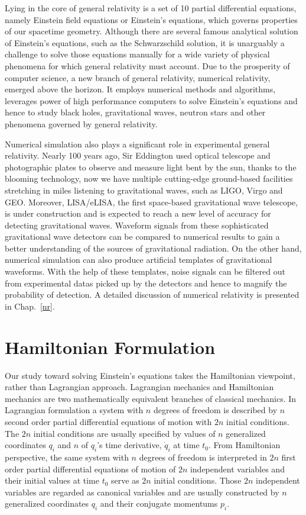 Lying in the core of general relativity is a set of 10 partial differential equations, namely Einstein field equations or Einstein's equations, which governs properties of our spacetime geometry. Although there are several famous analytical solution of Einstein's equations, such as the Schwarzschild solution, it is unarguably a challenge to solve those equations manually for a wide variety of physical phenomena for which general relativity must account. Due to the prosperity of computer science, a new branch of general relativity, numerical relativity, emerged above the horizon. It employs numerical methods and algorithms, leverages power of high performance computers to solve Einstein's equations and hence to study black holes, gravitational waves, neutron stars and other phenomena governed by general relativity.

Numerical simulation also plays a significant role in experimental general relativity. Nearly 100 years ago, Sir Eddington used optical telescope and photographic plates to observe and measure light bent by the sun, thanks to the blooming technology, now we have multiple cutting-edge ground-based facilities stretching in miles listening to gravitational waves, such as LIGO, Virgo and GEO. Moreover, LISA/eLISA, the first space-based gravitational wave telescope, is under construction and is expected to reach a new level of accuracy for detecting gravitational waves. Waveform signals from these sophisticated gravitational wave detectors can be compared to numerical results to gain a better understanding of the sources of gravitational radiation. On the other hand, numerical simulation can also produce artificial templates of gravitational waveforms. With the help of these templates, noise signals can be filtered out from experimental datas picked up by the detectors and hence to magnify the probability of detection. A detailed discussion of numerical relativity is presented in Chap.~\ref{nr}. 
\section{Hamiltonian Formulation}\label{ham}
Our study toward solving Einstein's equations takes the Hamiltonian viewpoint, rather than Lagrangian approach. Lagrangian mechanics and Hamiltonian mechanics are two mathematically equivalent branches of classical mechanics. In Lagrangian formulation a system with $n$ degrees of freedom is described by $n$ second order partial differential equations of motion with $2n$ initial conditions. The $2n$ initial conditions are usually specified by values of $n$ generalized coordinates $q_{i}$ and $n$ of $q_{i}$'s time derivative, ${\dot q}_{i}$ at time $t_{0}$. From Hamiltonian perspective, the same system with $n$ degrees of freedom is interpreted in $2n$ first order partial differential equations of motion of $2n$ independent variables and their initial values at time $t_{0}$ serve as $2n$ initial conditions. Those $2n$ independent variables are regarded as canonical variables and are usually constructed by $n$ generalized coordinates $q_{i}$ and their conjugate momentums $p_{i}$.

